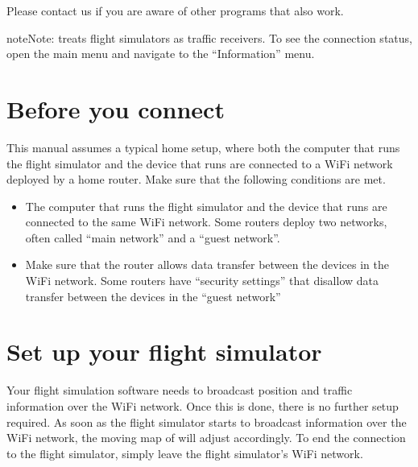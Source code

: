 \documentclass[letterpaper,10pt,english]{sphinxmanual}
\begin{document}
\sphinxAtStartPar
Please contact us if you are aware of other programs that also work.

\begin{sphinxadmonition}{note}{Note:}
\sphinxAtStartPar
{} treats flight simulators as traffic
receivers.  To see the connection status, open the main menu and navigate to
the “Information” menu.
\end{sphinxadmonition}


\section{Before you connect}
\label{\detokenize{02-steps/simulator:before-you-connect}}
\sphinxAtStartPar
This manual assumes a typical home setup, where both the computer that runs the
flight simulator and the device that runs  are
connected to a Wi\sphinxhyphen{}Fi network deployed by a home router.  Make sure that the
following conditions are met.
\begin{itemize}
\item {} 
\sphinxAtStartPar
The computer that runs the flight simulator and the device that runs  are connected to the same Wi\sphinxhyphen{}Fi network.  Some routers
deploy two networks, often called “main network” and a “guest network”.

\item {} 
\sphinxAtStartPar
Make sure that the router allows data transfer between the devices in the
Wi\sphinxhyphen{}Fi network.  Some routers have “security settings” that disallow data
transfer between the devices in the “guest network”

\end{itemize}


\section{Set up your flight simulator}
\label{\detokenize{02-steps/simulator:set-up-your-flight-simulator}}
\sphinxAtStartPar
Your flight simulation software needs to broadcast position and traffic
information over the Wi\sphinxhyphen{}Fi network.  Once this is done, there is no further
setup required.  As soon as the flight simulator starts to broadcast information
over the Wi\sphinxhyphen{}Fi network, the moving map of  will
adjust accordingly.  To end the connection to the flight simulator, simply leave
the flight simulator’s Wi\sphinxhyphen{}Fi network.
\end{document}
